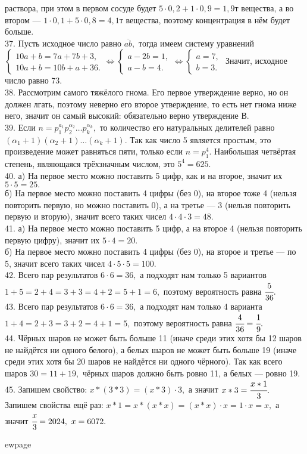 раствора, при этом в первом сосуде будет $5\cdot0,2+1\cdot0,9=1,9$т вещества, а во втором --- $1\cdot0,1+5\cdot0,8=4,1$т вещества, поэтому концентрация в нём будет больше.\\
37. Пусть исходное число равно $\overline{ab},$ тогда имеем систему уравнений $\begin{cases}10a+b=7a+7b+3,\\ 10a+b=10b+a+36.\end{cases}\Leftrightarrow
\begin{cases}a-2b=1,\\ a-b=4.\end{cases}\Leftrightarrow
\begin{cases}a=7,\\ b=3.\end{cases}$ Значит, исходное число равно 73.\\
38. Рассмотрим самого тяжёлого гнома. Его первое утверждение верно, но он должен лгать, поэтому неверно его второе утверждение, то есть нет гнома ниже него, значит он самый высокий: обязательно верно утверждение В.\\
39. Если $n=p_1^{a_1}p_2^{\alpha_2}\ldots p_k^{\alpha_k},$ то количество его натуральных делителей равно $(\alpha_1+1)(\alpha_2+1)\ldots (\alpha_k+1).$ Так как число 5 является простым, это произведение может равняться пяти, только если $n=p_1^4.$ Наибольшая четвёртая степень, являющаяся трёхзначным числом, это $5^4=625.$\\
40. а) На первое место можно поставить 5 цифр, как и на второе, значит их $5\cdot5=25.$\\
б) На первое место можно поставить 4 цифры (без 0), на второе тоже 4 (нельзя повторить первую, но можно поставить 0), а на третье --- 3 (нельзя повторить первую и вторую), значит всего таких чисел $4\cdot4\cdot3=48.$\\
41. а) На первое место можно поставить 5 цифр, а на второе 4 (нельзя повторить первую цифру), значит их $5\cdot4=20.$\\
б) На первое место можно поставить 4 цифры (без 0), на второе и третье --- по 5, значит всего таких чисел $4\cdot5\cdot5=100.$\\
42. Всего пар результатов $6\cdot6=36,$ а подходят нам только 5 вариантов $1+5=2+4=3+3=4+2=5+1=6,$ поэтому вероятность равна $\cfrac{5}{36}.$\\
43. Всего пар результатов $6\cdot6=36,$ а подходят нам только 4 варианта $1+4=2+3=3+2=4+1=5,$ поэтому вероятность равна $\cfrac{4}{36}=\cfrac{1}{9}.$\\
44. Чёрных шаров не может быть больше 11 (иначе среди этих хотя бы 12 шаров не найдётся ни одного белого), а белых шаров не может быть больше 19 (иначе среди этих хотя бы 20 шаров не найдётся ни одного чёрного). Так как всего шаров $30=11+19,$ чёрных шаров должно быть ровно 11, а белых --- ровно 19.\\
45. Запишем свойство: $x*(3*3)=(x*3)\cdot3,$ а значит $x*3=\cfrac{x*1}{3}.$ Запишем свойства ещё раз: $x*1=x*(x*x)=(x*x)\cdot x=1\cdot x=x,$ а значит
$\cfrac{x}{3}=2024,\ x=6072.$

ewpage
